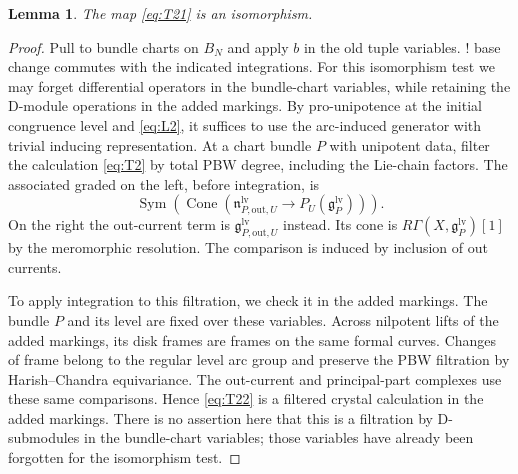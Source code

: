 \documentclass[11pt]{article}
\numberwithin{equation}{section}
\newtheorem{lemma}[theorem]{Lemma}
\theoremstyle{definition}
\theoremstyle{remark}
\begin{document}
\begin{lemma}\label{lem:ran-restriction-localization}
The map \eqref{eq:T21} is an isomorphism.
\end{lemma}

\begin{proof}
Pull to bundle charts on $B_N$ and apply $b$ in the old tuple
variables.  ! base change commutes with the indicated integrations.  For this
isomorphism test we may forget differential operators in the bundle-chart
variables, while retaining the D-module operations in the added markings.
By pro-unipotence at the initial congruence level and \eqref{eq:L2}, it
suffices to use the arc-induced generator with trivial inducing
representation.  At a chart bundle $P$ with unipotent data, filter the
calculation \eqref{eq:T2} by total PBW degree, including the Lie-chain
factors.  The associated graded on the left, before integration, is
\begin{equation}\label{eq:T22}
 \operatorname{Sym}\!\left(
   \operatorname{Cone}\!\left(
       \mathfrak n^{\mathrm{lv}}_{P,\mathrm{out},U}
          \longrightarrow P_U(\mathfrak g^{\mathrm{lv}}_P)
                         \right)\right).
\end{equation}
On the right the out-current term is
$\mathfrak g^{\mathrm{lv}}_{P,\mathrm{out},U}$ instead.  Its cone is
$R\Gamma(X,\mathfrak g^{\mathrm{lv}}_P)[1]$ by the meromorphic resolution.
The comparison is induced by inclusion of out currents.

To apply integration to this filtration, we check it in the added
markings.  The bundle $P$ and its level are fixed over these variables.
Across nilpotent lifts of the added markings, its disk frames are frames
on the same formal curves.  Changes of frame belong to the regular level
arc group and preserve the PBW filtration by Harish--Chandra equivariance.
The out-current and principal-part complexes use these same comparisons.
Hence \eqref{eq:T22} is a filtered crystal calculation in the added
markings.  There is no assertion here that this is a filtration by
D-submodules in the bundle-chart variables; those variables have already
been forgotten for the isomorphism test.


\end{proof}
\end{document}
